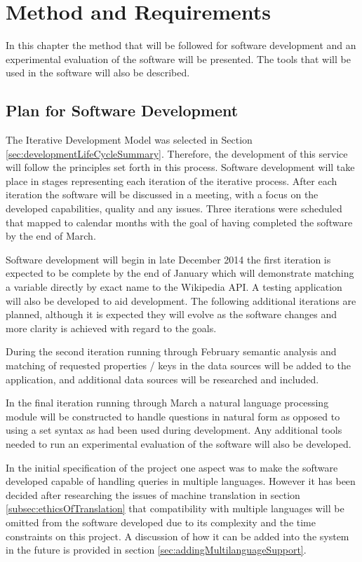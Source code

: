 \documentclass[authoryearcitations]{UoYCSproject}
\begin{document}
\newpage
\chapter{Method and Requirements}
\label{sec:method}

In this chapter the method that will be followed for software development and an experimental evaluation of the software will be presented. The tools that will be used in the software will also be described.

\section{Plan for Software Development}
\label{sec:planForSoftwareDevelopment}
The Iterative Development Model was selected in Section \ref{sec:developmentLifeCycleSummary}.  Therefore, the development of this service will follow the principles set forth in this process. Software development will take place in stages representing each iteration of the iterative process.  After each iteration the software will be discussed in a meeting, with a focus on the developed capabilities, quality and any issues. Three iterations were scheduled that mapped to calendar months with the goal of having completed the software by the end of March.

Software development will begin in late December 2014 the first iteration is expected to be complete by the end of January which will demonstrate matching a variable directly by exact name to the Wikipedia API. A testing application will also be developed to aid development. The following additional iterations are planned, although it is expected they will evolve as the software changes and more clarity is achieved with regard to the goals.

During the second iteration running through February semantic analysis and matching of requested properties / keys in the data sources will be added to the application, and additional data sources will be researched and included.

In the final iteration running through March a natural language processing module will be constructed to handle questions in natural form as opposed to using a set syntax as had been used during development. Any additional tools needed to run an experimental evaluation of the software will also be developed.

In the initial specification of the project one aspect was to make the software developed capable of handling queries in multiple languages. However it has been decided after researching the issues of machine translation in section \ref{subsec:ethicsOfTranslation} that compatibility with multiple languages will be omitted from the software developed due to its complexity and the time constraints on this project. A discussion of how it can be added into the system in the future is provided in section \ref{sec:addingMultilanguageSupport}.
\end{document}
